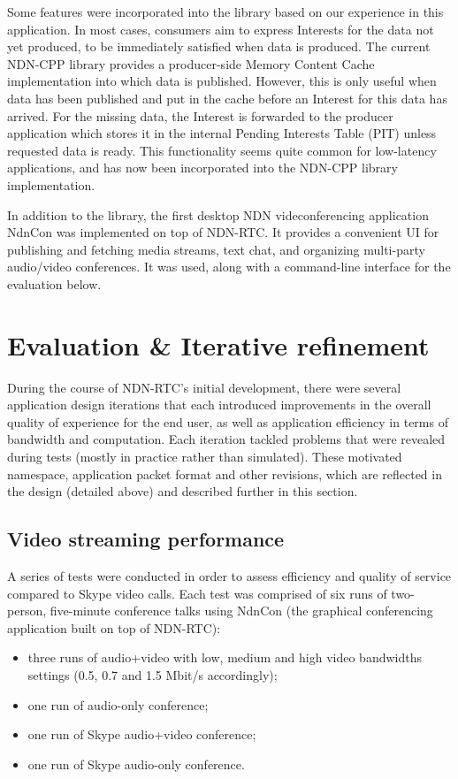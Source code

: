\documentclass{icn/sig-alternate-2012} %
\newcommand{\ndnrtcName}{NDN-RTC} %
\newcommand{\ndnconName}{NdnCon}
\begin{document}
Some features were incorporated into the library based on our experience in this application.
In most cases, consumers aim to express Interests for the data not yet produced, to be immediately satisfied when data is produced. The current NDN-CPP library provides a producer-side Memory Content Cache implementation into which data is published. However, this is only useful when data has been published and put in the cache before an Interest for this data has arrived. For the missing data, the Interest is forwarded to the producer application which stores it in the internal Pending Interests Table (PIT) unless requested data is ready. This functionality seems quite common for low-latency applications, and has now been incorporated into the NDN-CPP library implementation.

In addition to the library, the first desktop NDN videconferencing application \ndnconName{} \cite{ndncon} was implemented on top of \ndnrtcName{}. It provides a convenient UI for publishing and fetching media streams, text chat, and organizing multi-party audio/video conferences. It was used, along with a command-line interface for the evaluation below.

\section{Evaluation \& Iterative refinement}
\label{sec:eval} 
During the course of \ndnrtcName{}'s initial development, there were several application design iterations that each introduced improvements in the overall quality of experience for the end user, as well as application efficiency in terms of bandwidth and computation. Each iteration tackled problems that were revealed during tests (mostly in practice rather than simulated). These motivated namespace, application packet format and other revisions, which are reflected in the design (detailed above) and described further in this section. 

\subsection{Video streaming performance}
A series of tests were conducted in order to assess efficiency and quality of service compared to Skype video calls. Each test was comprised of six runs of two-person, five-minute conference talks using \ndnconName{} (the graphical conferencing application built on top of \ndnrtcName{}):
\begin{itemize}
\item three runs of audio+video with low, medium and high video bandwidths settings (0.5, 0.7 and 1.5 Mbit/s accordingly);
\item one run of audio-only conference;
\item one run of Skype audio+video conference;
\item one run of Skype audio-only conference.
\end{itemize}
\end{document}
